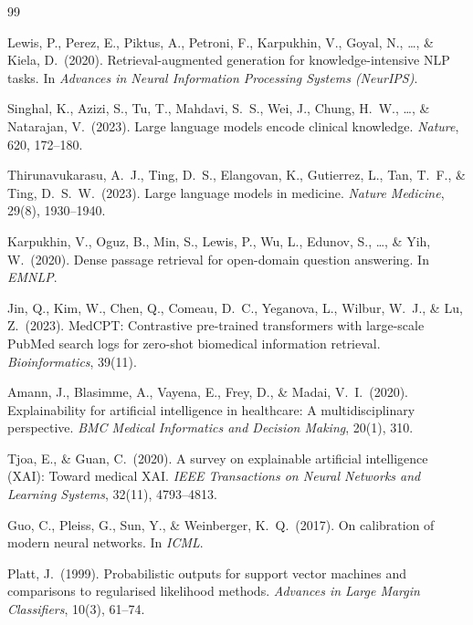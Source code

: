 \documentclass[10pt,twocolumn]{article}
\begin{document}
\begin{thebibliography}{99}

Lewis, P., Perez, E., Piktus, A., Petroni, F., Karpukhin, V., Goyal, N.,
  \ldots, \& Kiela, D.\ (2020).
\newblock Retrieval-augmented generation for knowledge-intensive NLP tasks.
\newblock In \emph{Advances in Neural Information Processing Systems (NeurIPS)}.

Singhal, K., Azizi, S., Tu, T., Mahdavi, S.~S., Wei, J., Chung, H.~W.,
  \ldots, \& Natarajan, V.\ (2023).
\newblock Large language models encode clinical knowledge.
\newblock \emph{Nature}, 620, 172--180.

Thirunavukarasu, A.~J., Ting, D.~S., Elangovan, K., Gutierrez, L.,
  Tan, T.~F., \& Ting, D.~S.~W.\ (2023).
\newblock Large language models in medicine.
\newblock \emph{Nature Medicine}, 29(8), 1930--1940.

Karpukhin, V., Oguz, B., Min, S., Lewis, P., Wu, L., Edunov, S.,
  \ldots, \& Yih, W.\ (2020).
\newblock Dense passage retrieval for open-domain question answering.
\newblock In \emph{EMNLP}.

Jin, Q., Kim, W., Chen, Q., Comeau, D.~C., Yeganova, L., Wilbur, W.~J.,
  \& Lu, Z.\ (2023).
\newblock MedCPT: Contrastive pre-trained transformers with large-scale
  PubMed search logs for zero-shot biomedical information retrieval.
\newblock \emph{Bioinformatics}, 39(11).

Amann, J., Blasimme, A., Vayena, E., Frey, D., \& Madai, V.~I.\ (2020).
\newblock Explainability for artificial intelligence in healthcare: A
  multidisciplinary perspective.
\newblock \emph{BMC Medical Informatics and Decision Making}, 20(1), 310.

Tjoa, E., \& Guan, C.\ (2020).
\newblock A survey on explainable artificial intelligence (XAI): Toward
  medical XAI.
\newblock \emph{IEEE Transactions on Neural Networks and Learning Systems},
  32(11), 4793--4813.

Guo, C., Pleiss, G., Sun, Y., \& Weinberger, K.~Q.\ (2017).
\newblock On calibration of modern neural networks.
\newblock In \emph{ICML}.

Platt, J.\ (1999).
\newblock Probabilistic outputs for support vector machines and comparisons
  to regularised likelihood methods.
\newblock \emph{Advances in Large Margin Classifiers}, 10(3), 61--74.


\end{thebibliography}
\end{document}
